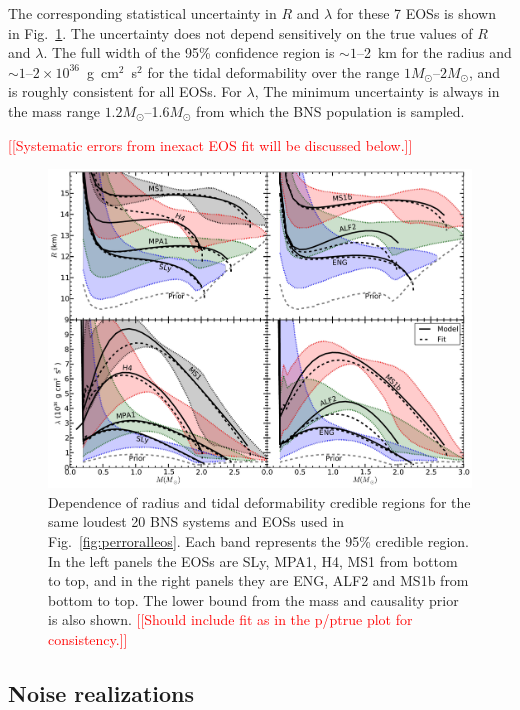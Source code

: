 \documentclass[twocolumn,prd,amssymb,aps,nofootinbib,showpacs,epsf]{revtex4}
\newcommand{\red}{\textcolor{red}}
\begin{document}
The corresponding statistical uncertainty in $R$ and $\lambda$ for these 7 EOSs is shown in Fig.~\ref{fig:structurealleos}. The uncertainty does not depend sensitively on the true values of $R$ and $\lambda$. The full width of the 95\% confidence region is $\sim 1$--2~km for the radius and $\sim 1$--$2\times 10^{36}$~g~cm$^2$~s$^2$ for the tidal deformability over the range $1M_\odot$--$2M_\odot$, and is roughly consistent for all EOSs. For $\lambda$, The minimum uncertainty is always in the mass range $1.2M_\odot$--1.6$M_\odot$ from which the BNS population is sampled.

\red{[[Systematic errors from inexact EOS fit will be discussed below.]]}

\begin{figure}[!htb]
\begin{center}
\includegraphics[width=6.4in]{constraintsalleos.pdf}
\caption{Dependence of radius and tidal deformability credible regions for the same loudest 20 BNS systems and EOSs used in Fig.~\ref{fig:perroralleos}. Each band represents the 95\% credible region. In the left panels the EOSs are SLy, MPA1, H4, MS1 from bottom to top, and in the right panels they are ENG, ALF2 and MS1b from bottom to top. The lower bound from the mass and causality prior is also shown. \red{[[Should include fit as in the p/ptrue plot for consistency.]]}}
\label{fig:structurealleos}
\end{center}
\end{figure}


\subsection{Noise realizations}
\end{document}

